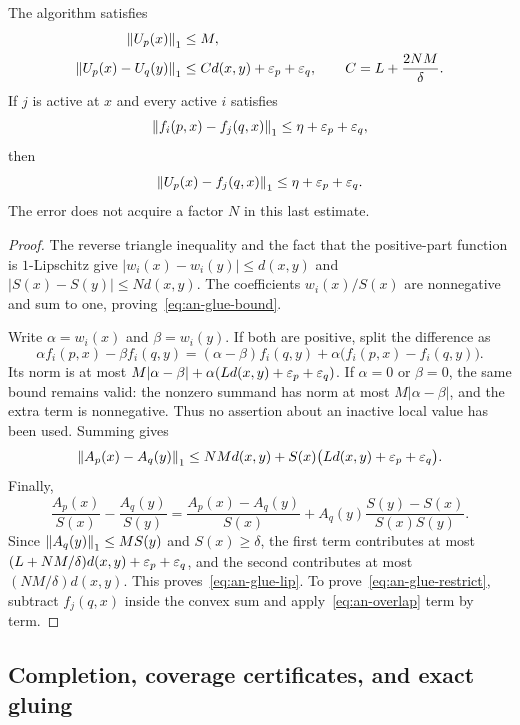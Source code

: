 \begin{theorem}
\label{thm:an-glue}
The algorithm satisfies
\begin{align}
 \left\lVert U_p(x)\right\rVert_1&\le M,\label{eq:an-glue-bound}\\
 \left\lVert U_p(x)-U_q(y)\right\rVert_1
 &\le C d(x,y)+\varepsilon_p+\varepsilon_q,
 \qquad C=L+\frac{2NM}{\delta}.
 \label{eq:an-glue-lip}
\end{align}
If $j$ is active at $x$ and every active $i$ satisfies
\begin{equation}
 \left\lVert f_i(p,x)-f_j(q,x)\right\rVert_1
 \le\eta+\varepsilon_p+\varepsilon_q,
 \label{eq:an-overlap}
\end{equation}
then
\begin{equation}
 \left\lVert U_p(x)-f_j(q,x)\right\rVert_1
 \le\eta+\varepsilon_p+\varepsilon_q.
 \label{eq:an-glue-restrict}
\end{equation}
The error does not acquire a factor $N$ in this last estimate.
\end{theorem}

\begin{proof}
The reverse triangle inequality and the fact that the positive-part
function is $1$-Lipschitz give
$|w_i(x)-w_i(y)|\le d(x,y)$ and
$|S(x)-S(y)|\le Nd(x,y)$.  The coefficients $w_i(x)/S(x)$ are
nonnegative and sum to one, proving~\eqref{eq:an-glue-bound}.

Write $\alpha=w_i(x)$ and $\beta=w_i(y)$.  If both are positive,
split the difference as
\[
 \alpha f_i(p,x)-\beta f_i(q,y)
 =(\alpha-\beta)f_i(q,y)
   +\alpha\bigl(f_i(p,x)-f_i(q,y)\bigr).
\]
Its norm is at most
$M|\alpha-\beta|+
\alpha(Ld(x,y)+\varepsilon_p+\varepsilon_q)$.
If $\alpha=0$ or $\beta=0$, the same bound remains valid: the
nonzero summand has norm at most $M|\alpha-\beta|$, and the extra
term is nonnegative.  Thus no assertion about an inactive local
value has been used.  Summing gives
\[
 \left\lVert A_p(x)-A_q(y)\right\rVert_1
 \le NMd(x,y)+S(x)
       \bigl(Ld(x,y)+\varepsilon_p+\varepsilon_q\bigr).
\]
Finally,
\[
 \frac{A_p(x)}{S(x)}-\frac{A_q(y)}{S(y)}
 =\frac{A_p(x)-A_q(y)}{S(x)}
  +A_q(y)\frac{S(y)-S(x)}{S(x)S(y)}.
\]
Since $\left\lVert A_q(y)\right\rVert_1\le MS(y)$ and $S(x)\ge\delta$, the first
term contributes at most $(L+NM/\delta)d(x,y)+\varepsilon_p+\varepsilon_q$,
and the second contributes at most $(NM/\delta)d(x,y)$.
This proves~\eqref{eq:an-glue-lip}.
To prove~\eqref{eq:an-glue-restrict}, subtract $f_j(q,x)$ inside
the convex sum and apply~\eqref{eq:an-overlap} term by term.
\end{proof}

\subsection{Completion, coverage certificates, and exact gluing}

